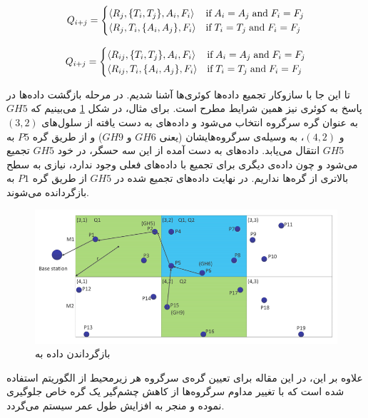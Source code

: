 \begin{equation}
Q_{i+j} = 
\begin{cases}
	\langle R_j, \{T_i, T_j\}, A_i, F_i \rangle & $if$ \; A_i = A_j \; $and$ \;F_i = F_j \\
	\langle R_j, T_i, \{A_i, A_j\}, F_i \rangle & $if$ \; T_i = T_j \; $and$ \;F_i = F_j
\end{cases}
\label{eq:eqf-query-subsume}
\end{equation}

\begin{equation}
Q_{i+j} = 
\begin{cases}
	\langle R_{ij}, \{T_i, T_j\}, A_i, F_i \rangle & $if$ \; A_i = A_j \; $and$ \;F_i = F_j \\
	\langle R_{ij}, T_i, \{A_i, A_j\}, F_i \rangle & $if$ \; T_i = T_j \; $and$ \;F_i = F_j
\end{cases}
\label{eq:eqf-query-intersect}
\end{equation}

\par
تا این جا  با سازوکار تجمیع داده‌ها کوئری‌ها آشنا شدیم. در مرحله بازگشت داده‌ها در پاسخ به کوئری نیز همین شرایط مطرح است. برای مثال، در شکل \ref{fig:egf-agg} می‌بینیم که $GH5$ به عنوان گره سرگروه انتخاب می‌شود و داده‌های به دست یافته از سلول‌های $(3,2)$ و $(4,2)$، به وسیله‌ی سرگروه‌هایشان (یعنی $GH6$ و $GH9$) و از طریق گره $P5$ به $GH5$ انتقال می‌یابد. داده‌های به دست آمده از این سه حسگر، در خود $GH5$ تجمیع می‌شود و چون داده‌ی دیگری برای تجمیع با داده‌های فعلی وجود ندارد، نیازی به سطح بالاتری از گره‌ها نداریم. در نهایت داده‌های تجمیع شده در $GH5$ از طریق گره $P1$ به  بازگردانده می‌شوند.

\begin{figure}
	\centering
	\includegraphics[width=0.7\linewidth]{figs/egf-agg}
	\caption {بازگرداندن داده به }
	\label{fig:egf-agg}
\end{figure}

\par
علاوه بر این، در این مقاله برای تعیین گره‌ی سرگروه هر زیرمحیط از الگوریتم  استفاده شده است که با تغییر مداوم سرگروه‌ها از کاهش چشم‌گیر یک گره خاص جلوگیری نموده و منجر به افزایش طول عمر سیستم می‌گردد.


